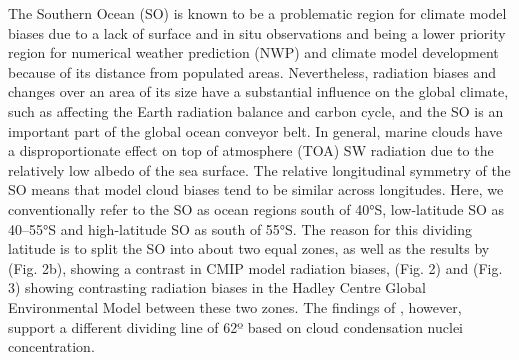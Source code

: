 \documentclass[12pt,a4paper]{article}
\begin{document}
The Southern Ocean (SO) is known to be a problematic region for climate model
biases due to a lack of surface and in situ observations and being a lower
priority region for numerical weather prediction (NWP) and climate model
development because of its distance from populated areas.  Nevertheless,
radiation biases and changes over an area of its size have a substantial
influence on the global climate, such as affecting the Earth radiation balance
and carbon cycle, and the SO is an important part of the global ocean conveyor
belt. In general, marine clouds have a disproportionate effect on top of
atmosphere (TOA) SW radiation due to the relatively low albedo of the sea
surface.  The relative longitudinal symmetry of the SO means that model cloud
biases tend to be similar across longitudes.  Here, we conventionally refer to
the SO as ocean regions south of 40°S, low-latitude SO as 40--55°S and
high-latitude SO as south of 55°S. The reason for this dividing latitude
is to split the SO into about two equal zones, as well as the results by
\cite{schuddeboom2021} (Fig. 2b), showing a contrast in CMIP model radiation
biases, \citep{schuddeboom2019} (Fig. 2) and \cite{kuma2020} (Fig. 3) showing
contrasting radiation biases in the Hadley Centre Global Environmental Model
between these two zones. The findings of \cite{niu2024}, however, support a
different dividing line of 62º based on cloud condensation nuclei
concentration.
\end{document}
